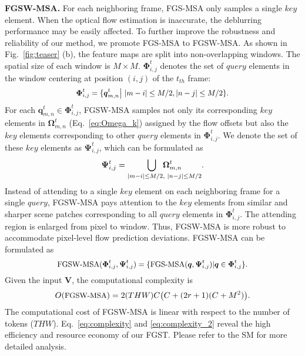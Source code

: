 \documentclass{article}
\begin{document}
	\noindent\textbf{FGSW-MSA.} For each neighboring frame, FGS-MSA only samples a single $key$ element. When the optical flow estimation is inaccurate, the deblurring performance may be easily affected. To further improve the robustness and reliability of our method, we promote FGS-MSA to FGSW-MSA. As shown in Fig.~\ref{fig:teaser} (b), the feature maps are split into non-overlapping windows. The spatial size of each window is $M\times M$. $\mathbf{\Phi}_{i,j}^t$ denotes the set of $query$ elements in the window centering at position $(i,j)$ of the $t_{th}$ frame:
	\vspace{-1mm}
	\begin{equation}
	\small
	\mathbf{\Phi}_{i,j}^t = \{\boldsymbol{q}_{m,n}^t \big|~|m-i| \leq M/2, |n-j| \leq M/2\}.
	\label{eq:FGSWMSA_1}
	\vspace{-1mm}
	\end{equation} 
	For each $\boldsymbol{q}_{m,n}^t \in \mathbf{\Phi}_{i,j}^t$, FGSW-MSA samples not only its corresponding $key$ elements in $\mathbf{\Omega}_{m,n}^t$ (Eq.~\eqref{eq:Omega_k}) assigned by the flow offsets but also the $key$ elements corresponding to other $query$ elements in $\mathbf{\Phi}_{i,j}^t$. We denote the set of these $key$ elements as $\mathbf{\Psi}_{i,j}^t$, which can be formulated as
	\vspace{-1mm}
	\begin{equation}
	\small
	\mathbf{\Psi}_{i,j}^t = \underset{\footnotesize |m-i| \leq M/2,~|n-j| \leq M/2}{\bigcup~~\mathbf{\Omega}_{m,n}^t}.
	\label{eq:FGSWMSA_2}
	\vspace{-1mm}
	\end{equation}
	Instead of attending to a single $key$ element on each neighboring frame for a single $query$, FGSW-MSA pays attention to the $key$ elements from similar and sharper scene patches corresponding to all $query$ elements in $\mathbf{\Phi}_{i,j}^t$. The attending region is enlarged from pixel to window. Thus, FGSW-MSA is more robust to accommodate pixel-level flow prediction deviations. FGSW-MSA can be formulated as
	\vspace{-0.5mm}
	\begin{equation}
	\small
	\text{FGSW-MSA}(\mathbf{\Phi}_{i,j}^t,\mathbf{\Psi}_{i,j}^t) = \{ \text{FGS-MSA}(\boldsymbol{q},\mathbf{\Psi}_{i,j}^t) | \boldsymbol{q} \in \mathbf{\Phi}_{i,j}^t \}.
	\vspace{-0.5mm}
	\end{equation}
	Given the input $\mathbf{V}$, the computational complexity is
\vspace{-0.5mm}
	\begin{equation}
	\small
O(\text{FGSW-MSA}) = 2(THW)C\big(C+(2r+1)(C+M^2)\big).
	\label{eq:complexity_2}
	\vspace{-0.5mm}
\end{equation}
	The computational cost of FGSW-MSA is linear with respect to the number of tokens ($THW$). Eq.~\eqref{eq:complexity} and \eqref{eq:complexity_2} reveal the high efficiency and resource economy of our FGST. Please refer to the SM for more detailed analysis.
	
\end{document}
